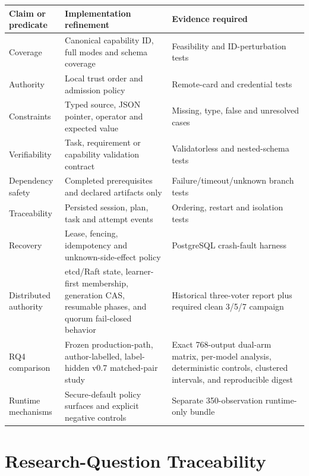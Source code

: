 \begin{longtable}{>{\raggedright\arraybackslash}p{}>{\raggedright\arraybackslash}p{}>{\raggedright\arraybackslash}p{}}
\toprule
\textbf{Claim or predicate} & \textbf{Implementation refinement} & \textbf{Evidence required} \\
\midrule
Coverage & Canonical capability ID, full modes and schema coverage & Feasibility and ID-perturbation tests \\
Authority & Local trust order and admission policy & Remote-card and credential tests \\
Constraints & Typed source, JSON pointer, operator and expected value & Missing, type, false and unresolved cases \\
Verifiability & Task, requirement or capability validation contract & Validatorless and nested-schema tests \\
Dependency safety & Completed prerequisites and declared artifacts only & Failure/timeout/unknown branch tests \\
Traceability & Persisted session, plan, task and attempt events & Ordering, restart and isolation tests \\
Recovery & Lease, fencing, idempotency and unknown-side-effect policy & PostgreSQL crash-fault harness \\
Distributed authority & etcd/Raft state, learner-first membership, generation CAS, resumable phases, and quorum fail-closed behavior & Historical three-voter report plus required clean 3/5/7 campaign \\
RQ4 comparison & Frozen production-path, author-labelled, label-hidden v0.7 matched-pair study & Exact 768-output dual-arm matrix, per-model analysis, deterministic controls, clustered intervals, and reproducible digest \\
Runtime mechanisms & Secure-default policy surfaces and explicit negative controls & Separate 350-observation runtime-only bundle \\
\bottomrule
\end{longtable}

\section{Research-Question Traceability}

